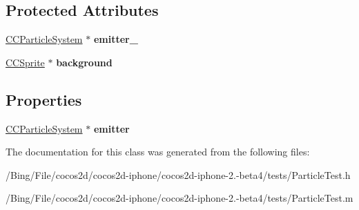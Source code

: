 \subsection*{Protected Attributes}
\begin{DoxyCompactItemize}
\item 
\hypertarget{interface_particle_demo_abb381620f4edeea017dc6e6b4e1f897c}{\hyperlink{interface_c_c_particle_system}{C\-C\-Particle\-System} $\ast$ {\bfseries emitter\-\_\-}}\label{interface_particle_demo_abb381620f4edeea017dc6e6b4e1f897c}

\item 
\hypertarget{interface_particle_demo_aee73bd42eb0ed8de9ee64c42a2beda7d}{\hyperlink{class_c_c_sprite}{C\-C\-Sprite} $\ast$ {\bfseries background}}\label{interface_particle_demo_aee73bd42eb0ed8de9ee64c42a2beda7d}

\end{DoxyCompactItemize}
\subsection*{Properties}
\begin{DoxyCompactItemize}
\item 
\hypertarget{interface_particle_demo_a1061e53d4218faebab07841f3d73d761}{\hyperlink{interface_c_c_particle_system}{C\-C\-Particle\-System} $\ast$ {\bfseries emitter}}\label{interface_particle_demo_a1061e53d4218faebab07841f3d73d761}

\end{DoxyCompactItemize}


The documentation for this class was generated from the following files\-:\begin{DoxyCompactItemize}
\item 
/\-Bing/\-File/cocos2d/cocos2d-\/iphone/cocos2d-\/iphone-\/2.-\/beta4/tests/Particle\-Test.\-h\item 
/\-Bing/\-File/cocos2d/cocos2d-\/iphone/cocos2d-\/iphone-\/2.-\/beta4/tests/Particle\-Test.\-m\end{DoxyCompactItemize}
